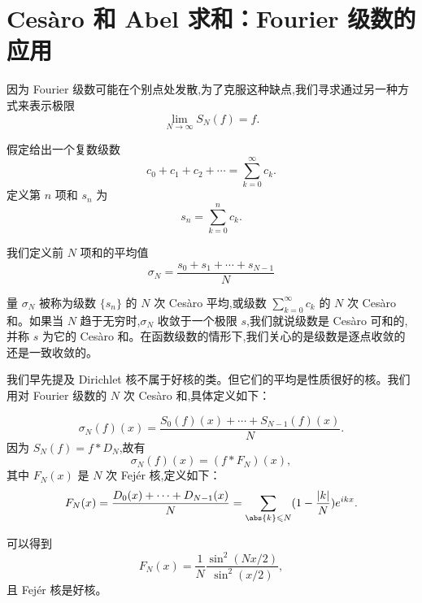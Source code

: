 \section{Ces\`aro 和 Abel 求和：Fourier 级数的应用}

因为 Fourier 级数可能在个别点处发散,为了克服这种缺点,我们寻求通过另一种方式来表示极限
\[
\lim_{N\to\infty}S_N(f)=f.
\]

假定给出一个复数级数
\[
c_0+c_1+c_2+\cdots=\sum_{k=0}^{\infty}c_k.
\]
定义第 $n$ 项和 $s_n$ 为
\[
s_n=\sum_{k=0}^{n}c_k.
\]
\begin{definition}
	我们定义前 $N$ 项和的平均值
\[
\sigma_N=\frac{s_0+s_1+\cdots+s_{N-1}}{N}
\]

量 $\sigma_N$ 被称为级数 $\{s_n\}$ 的 $N$ 次 Ces\`aro 平均,或级数 $\sum\limits_{k=0}^{\infty}c_k$ 的 $N$ 次 Ces\`aro 和。如果当 $N$ 趋于无穷时,$\sigma_N$ 收敛于一个极限 $s$,我们就说级数是 Ces\`aro 可和的,并称 $s$ 为它的 Ces\`aro 和。在函数级数的情形下,我们关心的是级数是逐点收敛的还是一致收敛的。

\end{definition}
我们早先提及 Dirichlet 核不属于好核的类。但它们的平均是性质很好的核。我们用对 Fourier 级数的 $N$ 次 Ces\`aro 和,具体定义如下：
\begin{definition}
	\[
\sigma_N(f)(x)=\frac{S_0(f)(x)+\cdots+S_{N-1}(f)(x)}{N}.
\]
因为 $S_N(f)=f\ast D_N$,故有
\[
\sigma_N(f)(x)=(f\ast F_N)(x),
\]
其中 $F_N(x)$ 是 $N$ 次 Fej\'er 核,定义如下：
\[
F_N(x)=\frac{D_0(x)+\cdots+D_{N-1}(x)}{N}=\sum_{\abs{k}\leqslant N}(1-\frac{|k|}{N})e^{ikx}.
\]
\end{definition}

\begin{lemma}
	可以得到
	\[
	F_N(x)=\frac1N\frac{\sin^2(Nx/2)}{\sin^2(x/2)},
	\]
	且 Fej\'er 核是好核。
\end{lemma}

